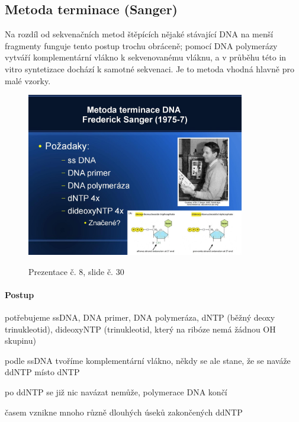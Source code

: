 \documentclass[DIV=8]{scrreprt}
\begin{document}
\subsection{Metoda terminace (Sanger)} \label{Metoda terminace (Sanger)}


Na rozdíl od sekvenačních metod štěpících nějaké stávající DNA na menší fragmenty funguje tento postup trochu obráceně; pomocí DNA polymerázy vytváří komplementární vlákno k sekvenovanému vláknu, a v průběhu této in vitro syntetizace dochází k samotné sekvenaci. Je to metoda vhodná hlavně pro malé vzorky.

\begin{figure}
    \caption{Prezentace č. 8, slide č. 30}
    \includegraphics[width=0.85\textwidth]{slides-8/slide-30.jpg}
    \centering
    \label{slides-8-slide-30}
\end{figure}

\paragraph{Postup}
\begin{myItemize}[nosep]
    \item potřebujeme ssDNA, DNA primer, DNA polymeráza, dNTP (běžný deoxy trinukleotid), dideoxyNTP (trinukleotid, který na ribóze nemá žádnou OH skupinu)
    \item podle ssDNA tvoříme komplementární vlákno, někdy se ale stane, že se naváže ddNTP místo dNTP
\begin{myItemize}[nosep]
    \item po ddNTP se již nic navázat nemůže, polymerace DNA končí
\end{myItemize}

    \item časem vznikne mnoho různě dlouhých úseků zakončených ddNTP
\end{myItemize}
\end{document}
